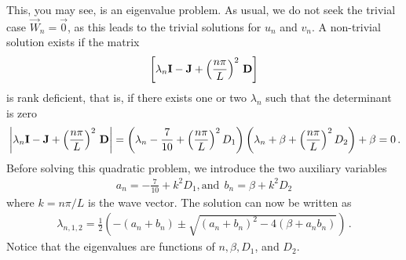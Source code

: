This, you may see, is an eigenvalue problem. As usual, we do not seek the trivial case 
$\vec{W}_n=\vec{0}$, as this leads to the trivial solutions for $u_n$ and $v_n$. 
A non-trivial solution exists if the matrix
\begin{equation}
	\left[
		\lambda_n \mathbf{I} - \mathbf{J} + \left(\frac{n\pi}{L}\right)^2 \, \mathbf{D}
	\right]
\end{equation}
is rank deficient, that is, if there exists one or two $\lambda_n$ such that the determinant is zero
\begin{eqnarray}
\label{eq:turingeig}	
	\mbox{} & \left|
		\lambda_n \mathbf{I} - \mathbf{J} + \left(\frac{n\pi}{L}\right)^2 \, \mathbf{D}
	\right| = 
	\left(
		\lambda_n - \frac{7}{10} +\left(\frac{n\pi}{L}\right)^2 D_1
	\right) 
\left(
	\lambda_n + \beta +\left(\frac{n\pi}{L}\right)^2 D_2
	\right) + \beta = 0  \, . \nonumber \\
\end{eqnarray}
Before solving this quadratic problem, we introduce the two auxiliary variables 
\begin{eqnarray}
	a_n = -\frac{7}{10} + k^2 D_1, \text{and} \  \
	b_n = \beta + k^2 D_2
\end{eqnarray}
where $k=n\pi/L$ is the wave vector. The solution can now be written as 
\begin{eqnarray}
	\lambda_{n,1,2} = \frac{1}{2}\left( 
		-(a_n+b_n) \pm \sqrt{(a_n+b_n)^2 - 4(\beta + a_nb_n)}
	\right) \, .
\end{eqnarray}
Notice that the eigenvalues are functions of $n, \beta, D_1$, and $D_2$. 

